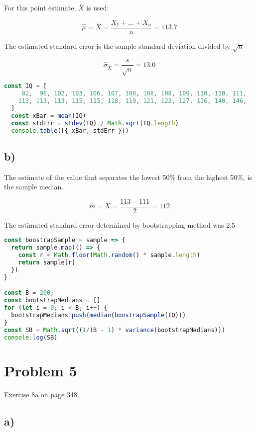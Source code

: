 \documentclass[a4paper,11pt]{article}
\begin{document}
For this point estimate, $\bar{X}$ is used:

\[ \hat{\mu} = \bar{X} = \frac{X_1 + ... + X_n}{n} = 113.7 \]

The estimated standard error is the sample standard deviation divided by $\sqrt{n}$

\[ \hat{\sigma}_{\bar{X}} = \frac{s}{\sqrt{n}} = 13.0 \]

\begin{lstlisting}[language=JavaScript]
  const IQ = [
     82,  96, 102, 103, 106, 107, 108, 108, 108, 109, 110, 110, 111, 
    113, 113, 113, 115, 115, 118, 119, 121, 122, 127, 136, 140, 146,
  ]
  const xBar = mean(IQ)
  const stdErr = stdev(IQ) / Math.sqrt(IQ.length)
  console.table([{ xBar, stdErr }])
\end{lstlisting}

\subsection*{b)}

The estimate of the value that separates the lowest 50\% from the highest 50\%, is the sample median.

\[ \hat{m} = \tilde{X} = \frac{113 - 111}{2} = 112\]

\vspace{5mm}
The estimated standard error determined by bootstrapping method was 2.5

\begin{lstlisting}[language=JavaScript]
const boostrapSample = sample => {
  return sample.map(() => {
    const r = Math.floor(Math.random() * sample.length)
    return sample[r]
  })
}

const B = 200;
const bootstrapMedians = []
for (let i = 0; i < B; i++) {
  bootstrapMedians.push(median(boostrapSample(IQ)))
}
const SB = Math.sqrt((1/(B - 1) * variance(bootstrapMedians)))
console.log(SB)  
\end{lstlisting}

\clearpage

\section*{Problem 5}

Exercise 8a on page 348.

\subsection*{a)}
\end{document}
